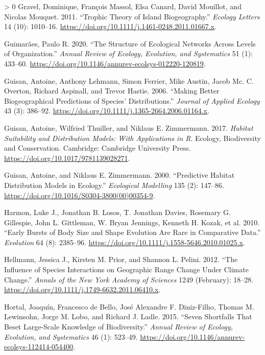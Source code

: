 \documentclass[11pt]{article}
\newlength{\cslhangindent}
\newenvironment{CSLReferences}[3] %
 {%
  \setlength{\parindent}{0pt}
  \ifodd #1 \everypar{\setlength{\hangindent}{\cslhangindent}}\ignorespaces\fi
  \ifnum #2 > 0
  \setlength{\parskip}{#2\baselineskip}
  \fi
 }%
 {}
\begin{document}
\begin{CSLReferences}{1}{0}
\leavevmode\hypertarget{ref-Gravel2011TroThe}{}%
Gravel, Dominique, François Massol, Elsa Canard, David Mouillot, and
Nicolas Mouquet. 2011. {``Trophic Theory of Island Biogeography.''}
\emph{Ecology Letters} 14 (10): 1010--16.
\url{https://doi.org/10.1111/j.1461-0248.2011.01667.x}.

\leavevmode\hypertarget{ref-Guimaraes2020StrEco}{}%
Guimarães, Paulo R. 2020. {``The Structure of Ecological Networks Across
Levels of Organization.''} \emph{Annual Review of Ecology, Evolution,
and Systematics} 51 (1): 433--60.
\url{https://doi.org/10.1146/annurev-ecolsys-012220-120819}.

\leavevmode\hypertarget{ref-Guisan2006MakBet}{}%
Guisan, Antoine, Anthony Lehmann, Simon Ferrier, Mike Austin, Jacob Mc.
C. Overton, Richard Aspinall, and Trevor Hastie. 2006. {``Making Better
Biogeographical Predictions of Species' Distributions.''} \emph{Journal
of Applied Ecology} 43 (3): 386--92.
\url{https://doi.org/10.1111/j.1365-2664.2006.01164.x}.

\leavevmode\hypertarget{ref-Guisan2017HabSui}{}%
Guisan, Antoine, Wilfried Thuiller, and Niklaus E. Zimmermann. 2017.
\emph{Habitat Suitability and Distribution Models: With Applications in
R}. Ecology, Biodiversity and Conservation. Cambridge: Cambridge
University Press. \url{https://doi.org/10.1017/9781139028271}.

\leavevmode\hypertarget{ref-Guisan2000PreHab}{}%
Guisan, Antoine, and Niklaus E. Zimmermann. 2000. {``Predictive Habitat
Distribution Models in Ecology.''} \emph{Ecological Modelling} 135 (2):
147--86. \url{https://doi.org/10.1016/S0304-3800(00)00354-9}.

\leavevmode\hypertarget{ref-Harmon2010EarBur}{}%
Harmon, Luke J., Jonathan B. Losos, T. Jonathan Davies, Rosemary G.
Gillespie, John L. Gittleman, W. Bryan Jennings, Kenneth H. Kozak, et
al. 2010. {``Early Bursts of Body Size and Shape Evolution Are Rare in
Comparative Data.''} \emph{Evolution} 64 (8): 2385--96.
\url{https://doi.org/10.1111/j.1558-5646.2010.01025.x}.

\leavevmode\hypertarget{ref-Hellmann2012InfSpe}{}%
Hellmann, Jessica J., Kirsten M. Prior, and Shannon L. Pelini. 2012.
{``The Influence of Species Interactions on Geographic Range Change
Under Climate Change.''} \emph{Annals of the New York Academy of
Sciences} 1249 (February): 18--28.
\url{https://doi.org/10.1111/j.1749-6632.2011.06410.x}.

\leavevmode\hypertarget{ref-Hortal2015SevSho}{}%
Hortal, Joaquín, Francesco de Bello, José Alexandre F. Diniz-Filho,
Thomas M. Lewinsohn, Jorge M. Lobo, and Richard J. Ladle. 2015. {``Seven
Shortfalls That Beset Large-Scale Knowledge of Biodiversity.''}
\emph{Annual Review of Ecology, Evolution, and Systematics} 46 (1):
523--49. \url{https://doi.org/10.1146/annurev-ecolsys-112414-054400}.


\end{CSLReferences}
\end{document}
